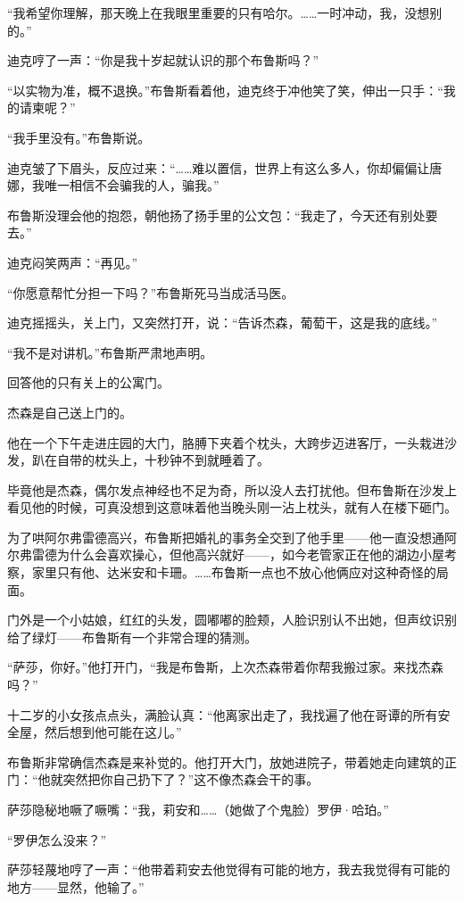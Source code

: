 \documentclass[../main]{subfiles}
\begin{document}
“我希望你理解，那天晚上在我眼里重要的只有哈尔。……一时冲动，我，没想别的。”

迪克哼了一声：“你是我十岁起就认识的那个布鲁斯吗？”

“以实物为准，概不退换。”布鲁斯看着他，迪克终于冲他笑了笑，伸出一只手：“我的请柬呢？”

“我手里没有。”布鲁斯说。

迪克皱了下眉头，反应过来：“……难以置信，世界上有这么多人，你却偏偏让唐娜，我唯一相信不会骗我的人，骗我。”

布鲁斯没理会他的抱怨，朝他扬了扬手里的公文包：“我走了，今天还有别处要去。”

迪克闷笑两声：“再见。”

“你愿意帮忙分担一下吗？”布鲁斯死马当成活马医。

迪克摇摇头，关上门，又突然打开，说：“告诉杰森，葡萄干，这是我的底线。”

“我不是对讲机。”布鲁斯严肃地声明。

回答他的只有关上的公寓门。

杰森是自己送上门的。

他在一个下午走进庄园的大门，胳膊下夹着个枕头，大跨步迈进客厅，一头栽进沙发，趴在自带的枕头上，十秒钟不到就睡着了。

毕竟他是杰森，偶尔发点神经也不足为奇，所以没人去打扰他。但布鲁斯在沙发上看见他的时候，可真没想到这意味着他当晚头刚一沾上枕头，就有人在楼下砸门。

为了哄阿尔弗雷德高兴，布鲁斯把婚礼的事务全交到了他手里——他一直没想通阿尔弗雷德为什么会喜欢操心，但他高兴就好——，如今老管家正在他的湖边小屋考察，家里只有他、达米安和卡珊。……布鲁斯一点也不放心他俩应对这种奇怪的局面。

门外是一个小姑娘，红红的头发，圆嘟嘟的脸颊，人脸识别认不出她，但声纹识别给了绿灯——布鲁斯有一个非常合理的猜测。

“萨莎，你好。”他打开门，“我是布鲁斯，上次杰森带着你帮我搬过家。来找杰森吗？”

十二岁的小女孩点点头，满脸认真：“他离家出走了，我找遍了他在哥谭的所有安全屋，然后想到他可能在这儿。”

布鲁斯非常确信杰森是来补觉的。他打开大门，放她进院子，带着她走向建筑的正门：“他就突然把你自己扔下了？”这不像杰森会干的事。

萨莎隐秘地噘了噘嘴：“我，莉安和\ldots\ldots（她做了个鬼脸）罗伊·哈珀。”

“罗伊怎么没来？”

萨莎轻蔑地哼了一声：“他带着莉安去他觉得有可能的地方，我去我觉得有可能的地方——显然，他输了。”
\end{document}
